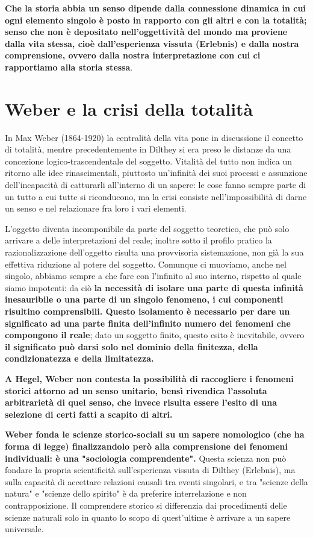 \textbf{Che la storia abbia un senso dipende dalla connessione dinamica in cui ogni elemento singolo è posto in rapporto con gli altri e con la totalità; senso che non è depositato nell'oggettività del mondo ma proviene dalla vita stessa, cioè dall'esperienza vissuta (Erlebnis) e dalla nostra comprensione, ovvero dalla nostra interpretazione con cui ci rapportiamo alla storia stessa}.

\section{Weber e la crisi della totalità}

In Max Weber (1864-1920) la centralità della vita pone in discussione il concetto di totalità, mentre precedentemente in Dilthey si era preso le distanze da una concezione logico-trascendentale del soggetto. Vitalità del tutto non indica un ritorno alle idee rinascimentali, piuttosto un'infinità dei suoi processi e assunzione dell'incapacità di catturarli all'interno di un sapere: le cose fanno sempre  parte di un tutto a cui tutte si riconducono, ma la crisi consiste nell'impossibilità di darne un senso e nel relazionare fra loro i vari elementi.

L'oggetto diventa incomponibile da parte del soggetto teoretico, che può solo arrivare a delle interpretazioni del reale; inoltre sotto il profilo pratico la razionalizzazione dell'oggetto risulta una provvisoria sistemazione, non già la sua effettiva riduzione al potere del soggetto. Comunque ci muoviamo, anche nel singolo, abbiamo sempre a che fare con l'infinito al suo interno, rispetto al quale siamo impotenti: da ciò \textbf{la necessità di isolare una parte di questa infinità inesauribile o una parte di un singolo fenomeno, i cui componenti risultino comprensibili. Questo isolamento è necessario per dare un significato ad una parte finita dell'infinito numero dei fenomeni che compongono il reale}; dato un soggetto finito, questo esito è inevitabile, ovvero \textbf{il significato può darsi solo nel dominio della finitezza, della condizionatezza e della limitatezza.}

\textbf{A Hegel, Weber non contesta la possibilità di raccogliere i fenomeni storici attorno ad un senso unitario, bensì rivendica l'assoluta arbitrarietà di quel senso, che invece risulta essere l'esito di una selezione di certi fatti a scapito di altri.}

\textbf{Weber fonda le scienze storico-sociali su un sapere nomologico (che ha forma di legge) finalizzandolo  però alla comprensione dei fenomeni individuali: è una "sociologia comprendente".} Questa scienza non può fondare la propria scientificità sull'esperienza vissuta di Dilthey (Erlebnis), ma sulla capacità di accettare relazioni causali tra eventi singolari, e tra "scienze della natura" e "scienze dello spirito" è da preferire interrelazione e non contrapposizione. Il comprendere storico si differenzia dai procedimenti delle scienze naturali solo in quanto lo scopo di quest'ultime è arrivare a un sapere universale.

